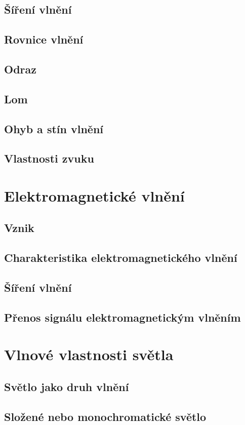 \documentclass[titlepage]{book}
\begin{document}
\section{Šíření vlnění}
\section{Rovnice vlnění}
\section{Odraz}
\section{Lom}
\section{Ohyb a stín vlnění}
\section{Vlastnosti zvuku}
\chapter{Elektromagnetické vlnění}
\section{Vznik}
\section{Charakteristika elektromagnetického vlnění}
\section{Šíření vlnění}
\section{Přenos signálu elektromagnetickým vlněním}
\chapter{Vlnové vlastnosti světla}
\section{Světlo jako druh vlnění}
\section{Složené nebo monochromatické světlo}
\end{document}
